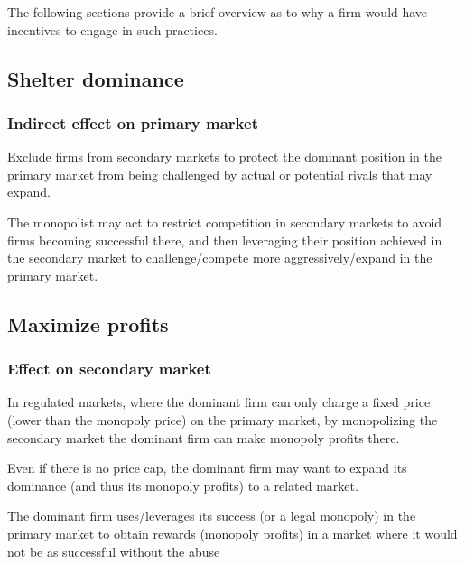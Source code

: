 
    The following sections provide a brief overview as to why a firm would have incentives to engage in such practices.

\newpage
    \subsection{Shelter dominance}
    \subsubsection*{Indirect effect on primary market}

        Exclude firms from secondary markets to protect the dominant position in the primary market from being challenged by actual or potential rivals that may expand. 
        
        The monopolist may act to restrict competition in secondary markets to avoid firms becoming successful there, and then leveraging their position achieved in the secondary market to challenge/compete more aggressively/expand in the primary market.

    \subsection{Maximize profits}
    \subsubsection*{Effect on secondary market}

        In regulated markets, where the dominant firm can only charge a fixed price (lower than the monopoly price) on the primary market, by monopolizing the secondary market the dominant firm can make monopoly profits there.
        
        Even if there is no price cap, the dominant firm may want to expand its dominance (and thus its monopoly profits) to a related market. 
        
        The dominant firm uses/leverages its success (or a legal monopoly) in the primary market to obtain rewards (monopoly profits) in a market where it would not be as successful without the abuse


